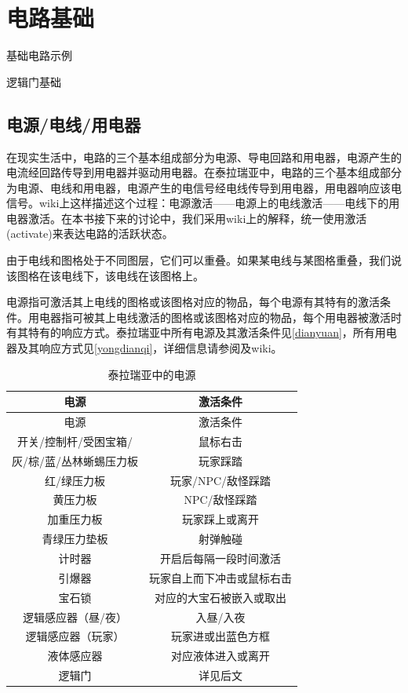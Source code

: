 \chapter{电路基础}\label{dianlujichu}

\begin{introduction}
\item {}
\item 基础电路示例
\item 逻辑门基础
\end{introduction}

\section{电源/电线/用电器}\label{sec10}

在现实生活中，电路的三个基本组成部分为电源、导电回路和用电器，电源产生的电流经回路传导到用电器并驱动用电器。在泰拉瑞亚中，电路的三个基本组成部分为电源、电线和用电器，电源产生的电信号经电线传导到用电器，用电器响应该电信号。wiki上这样描述这个过程：电源激活——电源上的电线激活——电线下的用电器激活。在本书接下来的讨论中，我们采用wiki上的解释，统一使用激活(activate)来表达电路的活跃状态。

由于电线和图格处于不同图层，它们可以重叠。如果某电线与某图格重叠，我们说该图格在该电线下，该电线在该图格上。

电源指可激活其上电线的图格或该图格对应的物品，每个电源有其特有的激活条件。用电器指可被其上电线激活的图格或该图格对应的物品，每个用电器被激活时有其特有的响应方式。泰拉瑞亚中所有电源及其激活条件见\autoref{dianyuan}，所有用电器及其响应方式见\autoref{yongdianqi}，详细信息请参阅及wiki。

\begin{longtable}{|c|c|}
\caption{泰拉瑞亚中的电源}\label{dianyuan}\\\hline
电源					&	激活条件					\\
\hline
\endfirsthead
\hline
电源					&	激活条件					\\
\hline
\endhead
\hline
\endfoot
开关/控制杆/受困宝箱/\DMC	&	鼠标右击					\\
\hline
灰/棕/蓝/丛林蜥蜴压力板	&	玩家踩踏					\\
\hline
红/绿压力板				&	玩家/NPC/敌怪踩踏			\\
\hline
黄压力板				&	NPC/敌怪踩踏				\\
\hline
加重压力板				&	玩家踩上或离开				\\
\hline
青绿压力垫板			&	射弹触碰					\\
\hline
计时器					&	开启后每隔一段时间激活		\\
\hline
引爆器					&	玩家自上而下冲击或鼠标右击	\\
\hline
宝石锁					&	对应的大宝石被嵌入或取出	\\
\hline
逻辑感应器（昼/夜）		&	入昼/入夜					\\
\hline
逻辑感应器（玩家）		&	玩家进或出蓝色方框			\\
\hline
液体感应器				&	对应液体进入或离开			\\
\hline
逻辑门					&	详见后文					\\
\end{longtable}

